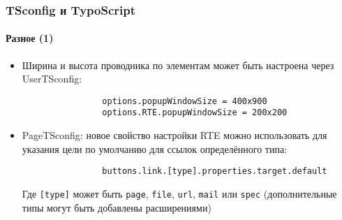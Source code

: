 \begin{frame}[fragile]
	\frametitle{TSconfig и TypoScript}
	\framesubtitle{Разное (1)}

	\begin{itemize}
		\item Ширина и высота проводника по элементам может быть настроена через UserTSconfig:

			\begin{lstlisting}
				options.popupWindowSize = 400x900
				options.RTE.popupWindowSize = 200x200
			\end{lstlisting}


		\item PageTSconfig: новое свойство настройки RTE можно использовать для указания цели по умолчанию для ссылок определённого типа:

			\begin{lstlisting}
				buttons.link.[type].properties.target.default
			\end{lstlisting}

			Где \texttt{[type]} может быть \texttt{page}, \texttt{file}, \texttt{url}, \texttt{mail} или \texttt{spec}\newline
			(дополнительные типы могут быть добавлены расширениями)

	\end{itemize}

\end{frame}


